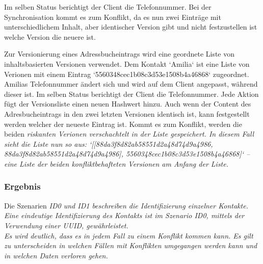 \begin{description}[leftmargin=0.5cm,style=nextline]
    Im selben Status berichtigt der Client die Telefonnummer. Bei der Synchronisation kommt es zum Konflikt, da es nun zwei Einträge mit unterschiedlichem Inhalt, aber identischer Version gibt und nicht festzustellen ist welche Version die neuere ist.\\
  \item[Szenario V4 -- Liste von inhaltsbasierten Versionen:]
    Zur Versionierung eines Adressbucheintrags wird eine geordnete Liste von inhaltsbasierten Versionen verwendet.
    Dem Kontakt `Amilia` ist eine Liste von Verionen mit einem Eintrag `5560348cec1b08c3d53e1508b4a46868` zugeordnet. Amilias Telefonnummer ändert sich und wird auf dem Client angepasst, während dieser  ist. Im selben Status berichtigt der Client die Telefonnummer. Jede Aktion fügt der Versionsliste einen neuen Hashwert hinzu. Auch wenn der Content des Adresbucheintrags in den zwei letzten Versionen identisch ist, kann festgestellt werden welcher der neueste Eintrag ist. Kommt es zum Konflikt, werden die beiden \it{riskanten} Verionen verschachtelt in der Liste gespeichert. In diesem Fall sieht die Liste nun so aus: `[[88da3f8d82ab58551d2a48d74d9a4986, 88da3f8d82ab58551d2a48d74d9a4986], 5560348cec1b08c3d53e1508b4a46868]` -- eine Liste der beiden konfliktbehafteten Versionen am Anfang der Liste.
\end{description}
%
%
\subsubsection*{Ergebnis}
Die Szenarien \it{ID0} und \it{ID1} beschreiben die Identifizierung einzelner Kontakte. Eine eindeutige Identifizierung des Kontakts ist im Szenario \it{ID0}, mittels der Verwendung einer \gls{UUID}, gewährleistet.\\
Es wird deutlich, dass es in jedem Fall zu einem Konflikt kommen kann. Es gilt zu unterscheiden in welchen Fällen mit Konflikten umgegangen werden kann und in welchen Daten verloren gehen.
